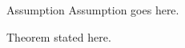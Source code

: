 \documentclass[11pt]{article}
\title{}
\date{\today}
\begin{document}
\maketitle

\begin{exampleblock}{Assumption}
  Assumption goes here.
\end{exampleblock}

\begin{theorem}
  Theorem stated here.
\end{theorem}
\end{document}
